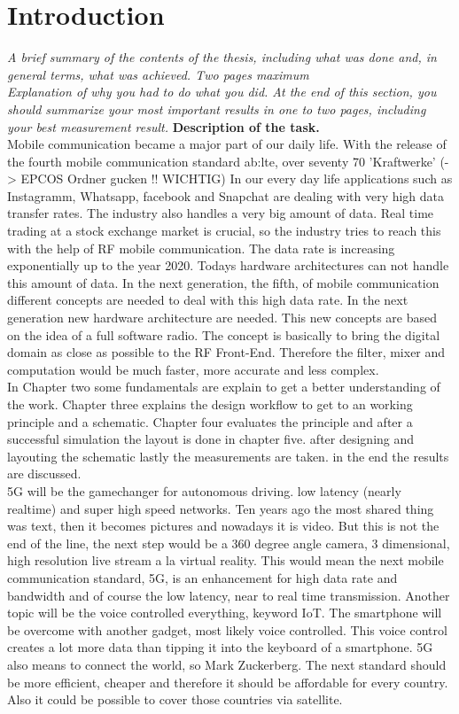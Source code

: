 \chapter{Introduction}
\textit{A brief summary of the contents of the thesis, including what was done and, in general terms, what was achieved. Two pages maximum}\\
\textit{Explanation of why you had to do what you did. At the end of this section, you should summarize your most important results in one to two pages, including your best measurement result.}
\textbf{Description of the task.}\\
Mobile communication became a major part of our daily life. With the release of the fourth mobile communication standard  \gls{ab:lte}, over seventy 70 'Kraftwerke' (-> EPCOS Ordner gucken !! WICHTIG) 
In our every day life applications such as Instagramm, Whatsapp, facebook  and Snapchat  are dealing with very high data transfer rates. The industry also handles a very big amount of data. Real time trading at a stock exchange market is crucial, so the industry tries to reach this with the help of RF mobile communication. The data rate is increasing exponentially up to the year 2020. Todays hardware architectures can not handle this amount of data. In the next generation, the fifth, of mobile communication different concepts are needed to deal with this high data rate. In the next generation new hardware architecture are needed. This new concepts are based on the idea of a full software radio. The concept is basically to bring the digital domain as close as possible to the RF Front-End. Therefore the filter, mixer and computation would be much faster, more accurate and less complex. \\
In Chapter two some fundamentals are explain to get a better understanding of the work. Chapter three explains the design workflow to get to an working principle and a schematic. Chapter four evaluates the principle and after a successful simulation the layout is done in chapter five. after designing and layouting the schematic lastly the measurements are taken. in the end the results are discussed.\\
5G will be the gamechanger for autonomous driving. low latency (nearly realtime) and super high speed networks. Ten years ago the most shared thing was text, then it becomes pictures and nowadays it is video. But this is not the end of the line, the next step would be a 360 degree angle camera, 3 dimensional, high resolution live stream a la virtual reality. This would mean the next mobile communication standard, 5G, is an enhancement for high data rate and bandwidth and of course the low latency, near to real time transmission. Another topic will be the voice controlled everything, keyword IoT. The smartphone will be overcome with another gadget, most likely voice controlled. This voice control creates a lot more data than tipping it into the keyboard of a smartphone. 5G also means to connect the world, so Mark Zuckerberg. The next standard should be more efficient, cheaper and therefore it should be affordable for every country. Also it could be possible to cover those countries via satellite.
